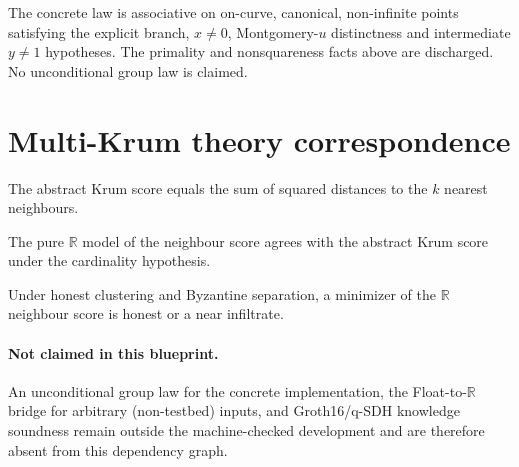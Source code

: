 \begin{theorem}
  \label{thm:affine_add_assoc}
  \leanok
  The concrete law is associative on on-curve, canonical, non-infinite points
  satisfying the explicit branch, $x \neq 0$, Montgomery-$u$ distinctness and
  intermediate $y \neq 1$ hypotheses. The primality and nonsquareness facts
  above are discharged. No unconditional group law is claimed.
\end{theorem}

\section{Multi-Krum theory correspondence}

\begin{theorem}
  \label{thm:krum_score_knn}
  \leanok
  The abstract Krum score equals the sum of squared distances to the $k$
  nearest neighbours.
\end{theorem}

\begin{theorem}
  \label{thm:neighbor_real}
  \leanok
  The pure $\mathbb{R}$ model of the neighbour score agrees with the abstract
  Krum score under the cardinality hypothesis.
\end{theorem}

\begin{theorem}
  \label{thm:real_selection_safe}
  \leanok
  Under honest clustering and Byzantine separation, a minimizer of the
  $\mathbb{R}$ neighbour score is honest or a near infiltrate.
\end{theorem}

\paragraph*{Not claimed in this blueprint.}
An unconditional group law for the concrete implementation, the Float-to-$\mathbb{R}$
bridge for arbitrary (non-testbed) inputs, and Groth16/q-SDH knowledge soundness
remain outside the machine-checked development and are therefore absent from
this dependency graph.
